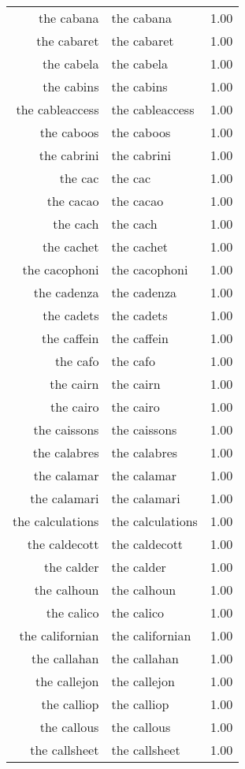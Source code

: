 \begin{table}[ht]
\begin{tabular}{rlr}
  the cabana & the cabana & 1.00 \\ 
  the cabaret & the cabaret & 1.00 \\ 
  the cabela & the cabela & 1.00 \\ 
  the cabins & the cabins & 1.00 \\ 
  the cableaccess & the cableaccess & 1.00 \\ 
  the caboos & the caboos & 1.00 \\ 
  the cabrini & the cabrini & 1.00 \\ 
  the cac & the cac & 1.00 \\ 
  the cacao & the cacao & 1.00 \\ 
  the cach & the cach & 1.00 \\ 
  the cachet & the cachet & 1.00 \\ 
  the cacophoni & the cacophoni & 1.00 \\ 
  the cadenza & the cadenza & 1.00 \\ 
  the cadets & the cadets & 1.00 \\ 
  the caffein & the caffein & 1.00 \\ 
  the cafo & the cafo & 1.00 \\ 
  the cairn & the cairn & 1.00 \\ 
  the cairo & the cairo & 1.00 \\ 
  the caissons & the caissons & 1.00 \\ 
  the calabres & the calabres & 1.00 \\ 
  the calamar & the calamar & 1.00 \\ 
  the calamari & the calamari & 1.00 \\ 
  the calculations & the calculations & 1.00 \\ 
  the caldecott & the caldecott & 1.00 \\ 
  the calder & the calder & 1.00 \\ 
  the calhoun & the calhoun & 1.00 \\ 
  the calico & the calico & 1.00 \\ 
  the californian & the californian & 1.00 \\ 
  the callahan & the callahan & 1.00 \\ 
  the callejon & the callejon & 1.00 \\ 
  the calliop & the calliop & 1.00 \\ 
  the callous & the callous & 1.00 \\ 
  the callsheet & the callsheet & 1.00 \\ 

\end{tabular}
\end{table}
